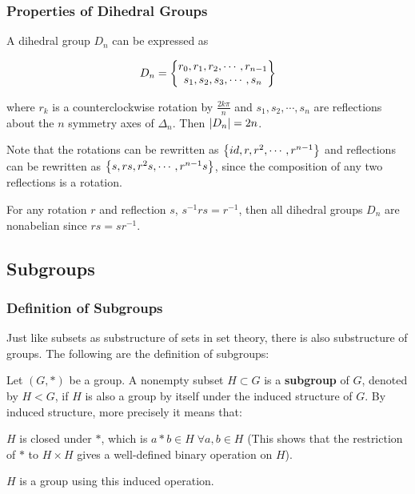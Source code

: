 \documentclass[a4paper,12pt]{article}
\begin{document}
\subsubsection{Properties of Dihedral Groups}
\begin{thm}
  A dihedral group $D_{n}$ can be expressed as

  $$D_{n}=\left\{ \begin{matrix}
    r_{0},r_{1},r_{2},\cdots,r_{n-1}\\
    s_{1},s_{2},s_{3},\cdots,s_{n}
  \end{matrix}\right\}$$\s

  where $r_{k}$ is a counterclockwise rotation by $\frac{2k\pi}{n}$ and $s_{1},s_{2},\cdots,s_{n}$ are reflections about the $n$ symmetry axes of $\Delta_{n}$. Then $\left| D_{n}\right|=2n$.
\end{thm}\n

Note that the rotations can be rewritten as $\left\{ id,r,r^{2},\cdots,r^{n-1}\right\}$ and reflections can be rewritten as $\left\{ s,rs,r^{2}s,\cdots,r^{n-1}s\right\}$, since the composition of any two reflections is a rotation.\n

\begin{pst}
  For any rotation $r$ and reflection $s$, $s^{-1}rs=r^{-1}$, then all dihedral groups $D_{n}$ are nonabelian since $rs=sr^{-1}$.
\end{pst}

\subsection{Subgroups}
\subsubsection{Definition of Subgroups}
Just like subsets as substructure of sets in set theory, there is also substructure of groups. The following are the definition of subgroups:\n

\begin{dft}
  Let $(G,*)$ be a group. A nonempty subset $H\subset G$ is a \textbf{subgroup} of $G$, denoted by $H<G$, if $H$ is also a group by itself under the induced structure of $G$. By induced structure, more precisely it means that:

  \begin{alist}
    \item $H$ is closed under $*$, which is $a*b\in H\;\forall a,b\in H$ (This shows that the restriction of $*$ to $H\times H$ gives a well-defined binary operation on $H$).
    \item $H$ is a group using this induced operation.
  \end{alist}
\end{dft}\n
\end{document}
